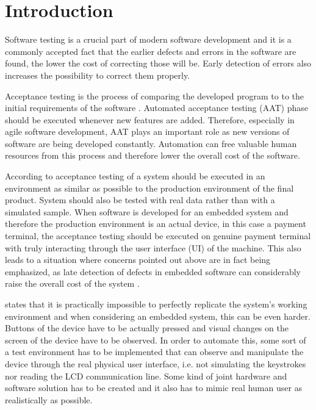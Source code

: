 
\chapter{Introduction}
\label{chapter:intro}

Software testing is a crucial part of modern software development and it is a commonly accepted fact that the earlier defects and errors in the software are found, the lower the cost of correcting those will be. Early detection of errors also increases the possibility to correct them properly. \emph{\citep{myers2011art}}

Acceptance testing is the process of comparing the developed program to to the initial requirements of the software \emph{\citep{myers2011art}}. Automated acceptance testing (AAT) phase should be executed whenever new features are added. Therefore, especially in agile software development, AAT plays an important role as new versions of software are being developed constantly. Automation can free valuable human resources from this process \emph{\citep{haugset2008automated}} and therefore lower the overall cost of the software.

According to \emph{\cite{sommerville2011software}} acceptance testing of a system should be executed in an environment as similar as possible to the production environment of the final product. System should also be tested with real data rather than with a simulated sample. When software is developed for an embedded system and therefore the production environment is an actual device, in this case a payment terminal, the acceptance testing should be executed on genuine payment terminal with truly interacting through the user interface (UI) of the machine. This also leads to a situation where concerns pointed out above are in fact being emphasized, as late detection of defects in embedded software can considerably raise the overall cost of the system \emph{\citep{ebert2009embedded}}.

\emph{\cite{sommerville2011software}} states that it is practically impossible to perfectly replicate the system's working environment and when considering an embedded system, this can be even harder. Buttons of the device have to be actually pressed and visual changes on the screen of the device have to be observed. In order to automate this, some sort of a test environment has to be implemented that can observe and manipulate the device through the real physical user interface, i.e. not simulating the keystrokes nor reading the LCD communication line. Some kind of joint hardware and software solution has to be created and it also has to mimic real human user as realistically as possible.

